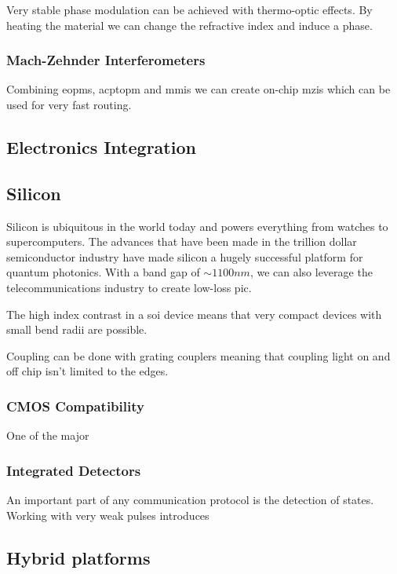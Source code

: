 Very stable phase modulation can be achieved with thermo-optic effects. By heating the material we can change the refractive index and induce a phase.

\subsubsection*{Mach-Zehnder Interferometers}

Combining \acp{eopm}, acp{topm} and \acp{mmi} we can create on-chip \acp{mzi} which can be used for very fast routing. 

\subsection*{Electronics Integration}

\subsection{Silicon}

Silicon is ubiquitous in the world today and powers everything from watches to supercomputers. The advances that have been made in the trillion dollar semiconductor industry have made silicon a hugely successful platform for quantum photonics. With a band gap of $\sim 1100nm$, we can also leverage the telecommunications industry to create low-loss \acl{pic}.

The high index contrast in a \ac{soi} device means that very compact devices with small bend radii are possible.

Coupling can be done with grating couplers meaning that coupling light on and off chip isn't limited to the edges.

\subsubsection*{CMOS Compatibility}

One of the major 

\subsubsection*{Integrated Detectors}

An important part of any communication protocol is the detection of states. Working with very weak pulses introduces 

\subsection{Hybrid platforms}

